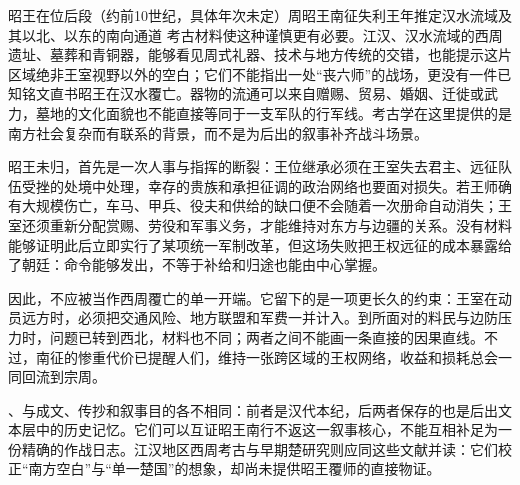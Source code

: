 \begin{event}{昭王在位后段（约前10世纪，具体年次未定）}{周昭王南征失利}{王年推定}{汉水流域及其以北、以东的南向通道}
考古材料使这种谨慎更有必要。江汉、汉水流域的西周遗址、墓葬和青铜器，能够看见周式礼器、技术与地方传统的交错，也能提示这片区域绝非王室视野以外的空白；它们不能指出一处“丧六师”的战场，更没有一件已知铭文直书昭王在汉水覆亡。器物的流通可以来自赠赐、贸易、婚姻、迁徙或武力，墓地的文化面貌也不能直接等同于一支军队的行军线。考古学在这里提供的是南方社会复杂而有联系的背景，而不是为后出的叙事补齐战斗场景。

昭王未归，首先是一次人事与指挥的断裂：王位继承必须在王室失去君主、远征队伍受挫的处境中处理，幸存的贵族和承担征调的政治网络也要面对损失。若王师确有大规模伤亡，车马、甲兵、役夫和供给的缺口便不会随着一次册命自动消失；王室还须重新分配赏赐、劳役和军事义务，才能维持对东方与边疆的关系。没有材料能够证明此后立即实行了某项统一军制改革，但这场失败把王权远征的成本暴露给了朝廷：命令能够发出，不等于补给和归途也能由中心掌握。

因此，不应被当作西周覆亡的单一开端。它留下的是一项更长久的约束：王室在动员远方时，必须把交通风险、地方联盟和军费一并计入。到所面对的料民与边防压力时，问题已转到西北，材料也不同；两者之间不能画一条直接的因果直线。不过，南征的惨重代价已提醒人们，维持一张跨区域的王权网络，收益和损耗总会一同回流到宗周。
\end{event}

\begin{sourcenote}[一条河与三层材料]
、与成文、传抄和叙事目的各不相同：前者是汉代本纪，后两者保存的也是后出文本层中的历史记忆。它们可以互证昭王南行不返这一叙事核心，不能互相补足为一份精确的作战日志。江汉地区西周考古与早期楚研究则应同这些文献并读：它们校正“南方空白”与“单一楚国”的想象，却尚未提供昭王覆师的直接物证。
\end{sourcenote}
